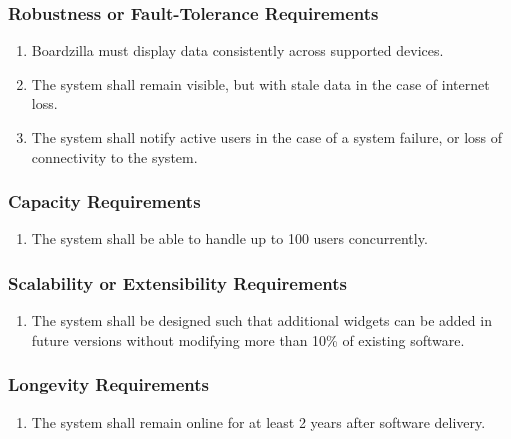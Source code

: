\documentclass[]{article}
\begin{document}
	\subsubsection{Robustness or Fault-Tolerance Requirements}
	\label{ssub:robustness_or_fault_tolerance_requirements}
	\begin{enumerate}[{PR}1.]
		\item Boardzilla must display data consistently across supported devices.
		\item The system shall remain visible, but with stale data in the case of internet loss.
		\item The system shall notify active users in the case of a system failure, or loss of connectivity to the system.
	\end{enumerate}
	
	\subsubsection{Capacity Requirements}
	\label{ssub:capacity_requirements}
	\begin{enumerate}[{PR}1. ]
		\item The system shall be able to handle up to 100 users concurrently.
	\end{enumerate}
	
	\subsubsection{Scalability or Extensibility Requirements}
	\label{ssub:scalability_or_extensibility_requirements}
	\begin{enumerate}[{PR}1. ]
		\item The system shall be designed such that additional widgets can be added in future versions without modifying more than 10\% of existing software.
	\end{enumerate}
	
	\subsubsection{Longevity Requirements}
	\label{ssub:longevity_requirements}
	\begin{enumerate}[{PR}1. ]
		\item The system shall remain online for at least 2 years after software delivery. 
	\end{enumerate}
	
\end{document}
